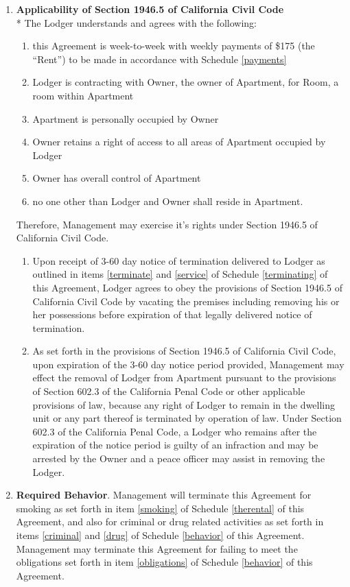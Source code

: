 \documentclass[]{article}
\newcommand{\behavior}{Required Behavior}
\newcommand{\management}{Management}
\newcommand{\apt}{Apartment}
\newcommand{\room}{Room}
\newcommand{\rent}{\$175}
\begin{document}
	\begin{enumerate}
		\item \textbf{Applicability of Section 1946.5 of California Civil Code}\\*
			The Lodger understands and agrees with the following:
			\begin{enumerate}
				\item this Agreement is week-to-week with weekly payments of \rent{} (the ``Rent'') to be made in accordance with Schedule \ref{payments}
				\item Lodger is contracting with Owner, the owner of \apt{}, for \room{}, a room within \apt{}
				\item \apt{} is personally occupied by Owner
				\item Owner retains a right of access to all areas of \apt{} occupied by Lodger 
				\item Owner has overall control of \apt{} 
				\item no one other than Lodger and Owner shall reside in \apt{}. 
			\end{enumerate}
			Therefore, \management{} may exercise it's rights under Section 1946.5 of California Civil Code.
			\begin{enumerate}
				\item Upon receipt of 3-60 day notice of termination delivered to Lodger as outlined in items \ref{terminate} and \ref{service} of Schedule \ref{terminating} of this Agreement, Lodger agrees to obey the provisions of Section 1946.5 of California Civil Code by vacating the premises including removing his or her possessions before expiration of that legally delivered notice of termination.
				\item As set forth in the provisions of Section 1946.5 of California Civil Code, upon expiration of the 3-60 day notice period provided, \management{} may effect the removal of Lodger from \apt{} pursuant to the provisions of Section 602.3 of the California Penal Code or other applicable provisions of law, because any right of Lodger to remain in the dwelling unit or any part thereof is terminated by operation of law. Under Section 602.3 of the California Penal Code, a Lodger who remains after the expiration of the notice period is guilty of an infraction and may be arrested by the Owner and a peace officer may assist in removing the Lodger.
			\end{enumerate} 

		\item \textbf{\behavior{}}.
			\management{} will terminate this Agreement for smoking as set forth in item \ref{smoking} of Schedule \ref{therental} of this Agreement, and also for criminal or drug related activities as set forth in items \ref{criminal} and \ref{drug} of Schedule \ref{behavior} of this Agreement. \management{} may terminate this Agreement for failing to meet the obligations set forth in item \ref{obligations} of Schedule \ref{behavior} of this Agreement.
	

\end{enumerate}
\end{document}
